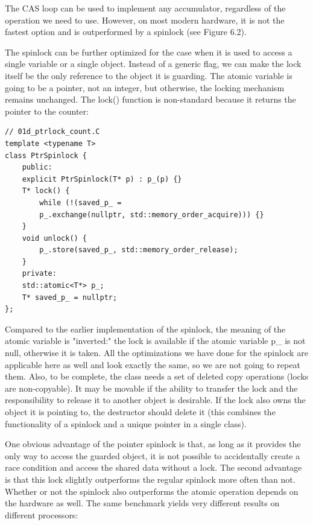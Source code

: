 The CAS loop can be used to implement any accumulator, regardless of the operation we need to use. However, on most modern hardware, it is not the fastest option and is outperformed by a spinlock (see Figure 6.2).

The spinlock can be further optimized for the case when it is used to access a single variable or a single object. Instead of a generic flag, we can make the lock itself be the only reference to the object it is guarding. The atomic variable is going to be a pointer, not an integer, but otherwise, the locking mechanism remains unchanged. The lock() function is non-standard because it returns the pointer to the counter:

\begin{lstlisting}[style=styleCXX]
// 01d_ptrlock_count.C
template <typename T>
class PtrSpinlock {
	public:
	explicit PtrSpinlock(T* p) : p_(p) {}
	T* lock() {
		while (!(saved_p_ =
		p_.exchange(nullptr, std::memory_order_acquire))) {}
	}
	void unlock() {
		p_.store(saved_p_, std::memory_order_release);
	}
	private:
	std::atomic<T*> p_;
	T* saved_p_ = nullptr;
};
\end{lstlisting}

Compared to the earlier implementation of the spinlock, the meaning of the atomic variable is "inverted:" the lock is available if the atomic variable p\_ is not null, otherwise it is taken. All the optimizations we have done for the spinlock are applicable here as well and look exactly the same, so we are not going to repeat them. Also, to be complete, the class needs a set of deleted copy operations (locks are non-copyable). It may be movable if the ability to transfer the lock and the responsibility to release it to another object is desirable. If the lock also owns the object it is pointing to, the destructor should delete it (this combines the functionality of a spinlock and a unique pointer in a single class).

One obvious advantage of the pointer spinlock is that, as long as it provides the only way to access the guarded object, it is not possible to accidentally create a race condition and access the shared data without a lock. The second advantage is that this lock slightly outperforms the regular spinlock more often than not. Whether or not the spinlock also outperforms the atomic operation depends on the hardware as well. The same benchmark yields very different results on different processors:

